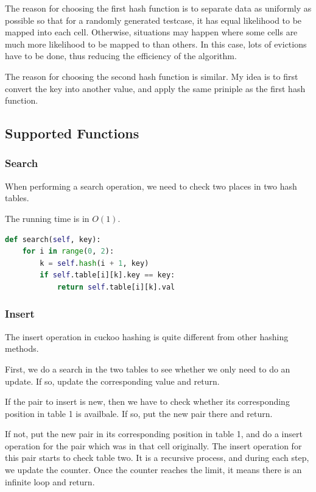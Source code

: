 \documentclass{article}
\begin{document}
\begin{spacing}{1.2}
The reason for choosing the first hash function is to separate data as uniformly as possible so that for a randomly generated testcase, it has equal likelihood to be mapped into each cell. Otherwise, situations may happen where some cells are much more likelihood to be mapped to than others. In this case, lots of evictions have to be done, thus reducing the efficiency of the algorithm.

The reason for choosing the second hash function is similar. My idea is to first convert the key into another value, and apply the same priniple as the first hash function.

\subsection{Supported Functions}
\subsubsection{Search}
When performing a search operation, we need to check two places in two hash tables.

The running time is in $O(1)$.
\begin{lstlisting}[language=Python]
def search(self, key):
    for i in range(0, 2):
        k = self.hash(i + 1, key)
        if self.table[i][k].key == key:
            return self.table[i][k].val
\end{lstlisting}

\subsubsection{Insert}
The insert operation in cuckoo hashing is quite different from other hashing methods.

First, we do a search in the two tables to see whether we only need to do an update. If so, update the corresponding value and return.

If the pair to insert is new, then we have to check whether its corresponding position in table 1 is availbale. If so, put the new pair there and return.

If not, put the new pair in its corresponding position in table 1, and do a insert operation for the pair which was in that cell originally. The insert operation for this pair starts to check table two. It is a recursive process, and during each step, we update the counter. Once the counter reaches the limit, it means there is an infinite loop and return.


\end{spacing}
\end{document}
